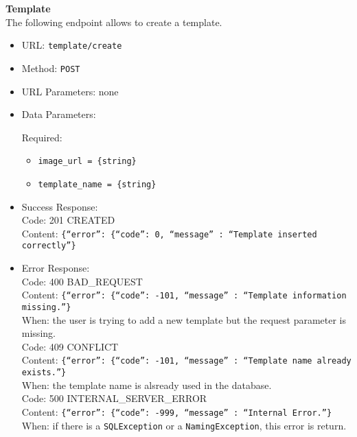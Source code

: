 \noindent\textbf{Template}\\
The following endpoint allows to create a template.

\begin{itemize}
    \item URL: \texttt{template/create}
    \item Method: \texttt{POST}
    \item URL Parameters: none
    \item Data Parameters:
    
    Required:
    
    \begin{itemize}
        \item \texttt{image\_url = \{string\}}
        \item \texttt{template\_name = \{string\}}
    \end{itemize}
    
    
    \item Success Response:\\
    
    Code: 201 CREATED\\
    Content: \texttt{\{``error'': \{``code'': 0, ``message'' : ``Template inserted correctly''\}}\\
    \item Error Response:\\

    Code: 400 BAD\_REQUEST\\
    Content: \texttt{\{``error'': \{``code'': -101, ``message'' : ``Template information missing.''\}}\\
    When: the user is trying to add a new template but the request parameter is missing.\\

    Code: 409 CONFLICT\\
    Content: \texttt{\{``error'': \{``code'': -101, ``message'' : ``Template name already exists.''\}}\\
    When: the template name is alsready used in the database.\\

    Code: 500 INTERNAL\_SERVER\_ERROR\\
    Content: \texttt{\{``error'': \{``code'': -999, ``message'' : ``Internal Error.''\}}\\
    When: if there is a \texttt{SQLException} or a \texttt{NamingException}, this error is return.\\
    
\end{itemize}


